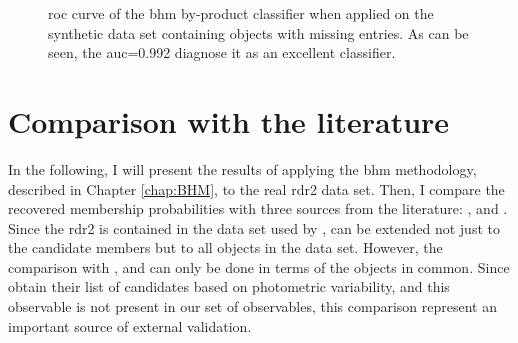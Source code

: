 \begin{figure}[!htp]
\begin{center}
\caption{\gls{roc} curve of the \gls{bhm} by-product classifier when applied on the synthetic data set containing objects with missing entries. As can be seen, the \gls{auc}=0.992 diagnose it as an excellent classifier.}
\label{fig:ROC}
\end{center}
\end{figure}

 
\section{Comparison with the literature}
\label{sect:memberscomparison}

In the following, I will present the results of applying the \gls{bhm} methodology, described in Chapter \ref{chap:BHM}, to the real \gls{rdr2} data set. Then, I compare the recovered membership probabilities with three sources from the literature: \citet{Stauffer2007}, \citet{Bouy2015} and \citet{Rebull2016}.  Since the \gls{rdr2} is contained in the data set used by \citet{Bouy2015}, can be extended not just to the candidate members but to all objects in the data set. However, the comparison with \citet{Stauffer2007}, and \citet{Rebull2016} can only be done in terms of the objects in common. Since \citet{Rebull2016} obtain their list of candidates based on photometric variability, and this observable is not present in our set of observables, this comparison represent an important source of external validation. 


